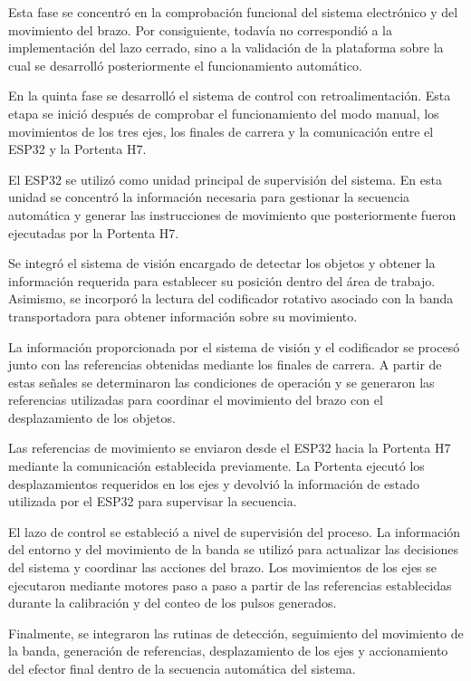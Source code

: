 Esta fase se concentró en la comprobación funcional del sistema electrónico y del movimiento del brazo. Por consiguiente, todavía no correspondió a la implementación del lazo cerrado, sino a la validación de la plataforma sobre la cual se desarrolló posteriormente el funcionamiento automático.



En la quinta fase se desarrolló el sistema de control con retroalimentación. Esta etapa se inició después de comprobar el funcionamiento del modo manual, los movimientos de los tres ejes, los finales de carrera y la comunicación entre el ESP32 y la Portenta H7.

El ESP32 se utilizó como unidad principal de supervisión del sistema. En esta unidad se concentró la información necesaria para gestionar la secuencia automática y generar las instrucciones de movimiento que posteriormente fueron ejecutadas por la Portenta H7.

Se integró el sistema de visión encargado de detectar los objetos y obtener la información requerida para establecer su posición dentro del área de trabajo. Asimismo, se incorporó la lectura del codificador rotativo asociado con la banda transportadora para obtener información sobre su movimiento.

La información proporcionada por el sistema de visión y el codificador se procesó junto con las referencias obtenidas mediante los finales de carrera. A partir de estas señales se determinaron las condiciones de operación y se generaron las referencias utilizadas para coordinar el movimiento del brazo con el desplazamiento de los objetos.

Las referencias de movimiento se enviaron desde el ESP32 hacia la Portenta H7 mediante la comunicación establecida previamente. La Portenta ejecutó los desplazamientos requeridos en los ejes y devolvió la información de estado utilizada por el ESP32 para supervisar la secuencia.

El lazo de control se estableció a nivel de supervisión del proceso. La información del entorno y del movimiento de la banda se utilizó para actualizar las decisiones del sistema y coordinar las acciones del brazo. Los movimientos de los ejes se ejecutaron mediante motores paso a paso a partir de las referencias establecidas durante la calibración y del conteo de los pulsos generados.

Finalmente, se integraron las rutinas de detección, seguimiento del movimiento de la banda, generación de referencias, desplazamiento de los ejes y accionamiento del efector final dentro de la secuencia automática del sistema.


